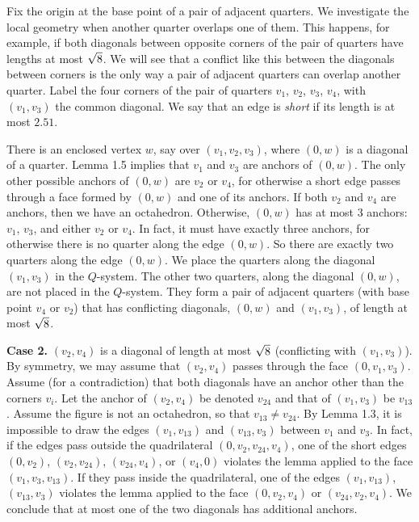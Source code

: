 Fix the origin at the base point of a pair of adjacent quarters.
We investigate the local geometry when another quarter overlaps
one of them.  This happens, for example, if both diagonals between
opposite corners of the pair of quarters have lengths
at most $\sqrt8$.  We will see that a conflict like this between the
diagonals between corners is the
only way a pair of adjacent quarters can overlap another quarter.
Label the four corners of the pair of quarters 
$v_1$, $v_2$, $v_3$, $v_4$,
with $(v_1,v_3)$ the common diagonal.  
We say that an edge is {\it short\/}
if its length is at most $2.51$.

There is an enclosed vertex $w$, say over 
$(v_1,v_2,v_3)$, where $(0,w)$ is a diagonal of a quarter.  
Lemma 1.5 implies that $v_1$ and $v_3$ are anchors of $(0,w)$.
The only other possible anchors of $(0,w)$ are $v_2$ or $v_4$,
for otherwise a short edge passes through a face formed by $(0,w)$ and
one of its anchors.
If both $v_2$ and $v_4$ are anchors, then we have an
octahedron.  Otherwise, $(0,w)$ has at most $3$ anchors: $v_1$, $v_3$,
and either $v_2$ or $v_4$.  In fact, it must have exactly three
anchors, for otherwise there is no quarter along the edge $(0,w)$. 
So there are exactly two quarters along the edge $(0,w)$.
We place the quarters along the diagonal $(v_1,v_3)$
in the $Q$-system.   
The other two quarters, along the diagonal $(0,w)$, are not placed
in the $Q$-system.  They form a pair of adjacent quarters
(with base point $v_4$ or $v_2$) that has conflicting diagonals,
$(0,w)$ and $(v_1,v_3)$,
of length at most $\sqrt8$.

\noindent
{\bf Case 2.}  $(v_2,v_4)$ is a diagonal of 
length at most $\sqrt8$ (conflicting with $(v_1,v_3)$).  By
symmetry, we may assume that $(v_2,v_4)$ passes through the face $(0,v_1,v_3)$.
Assume (for a contradiction) that both diagonals have an 
anchor other than the corners $v_i$.  
Let the anchor of $(v_2,v_4)$ be denoted
$v_{24}$ and that of $(v_1,v_3)$ be $v_{13}$. 
Assume the figure is not an octahedron, so that
$v_{13}\ne v_{24}$.  
By Lemma 1.3, it is impossible to draw the edges $(v_1,v_{13})$
and $(v_{13},v_3)$ between $v_1$ and $v_3$.  In fact, if the
edges pass outside the quadrilateral $(0,v_2,v_{24},v_4)$, one of the
short edges $(0,v_2)$, $(v_2,v_{24})$, $(v_{24},v_4)$, or $(v_4,0)$
violates the lemma applied to the face $(v_1,v_3,v_{13})$.  If they
pass inside the quadrilateral, one of the edges $(v_1,v_{13})$, $(v_{13},v_3)$
violates the lemma applied to the face $(0,v_{2},v_4)$ or $(v_{24},v_2,v_4)$.
 We conclude that at most one of the two diagonals
has additional anchors.

